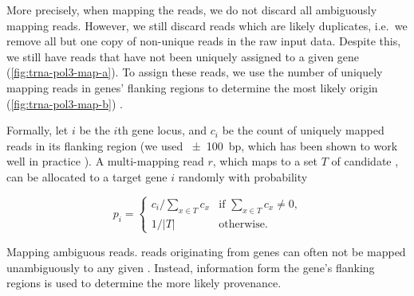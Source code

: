 More precisely, when mapping the reads, we do not discard all ambiguously
mapping reads. However, we still discard reads which are likely \pcr duplicates,
i.e.\ we remove all but one copy of non-unique reads in the raw input data.
Despite this, we still have reads that have not been uniquely assigned to a
given \trna gene (\cref{fig:trna-pol3-map-a}). To assign these reads, we use the
number of uniquely mapping reads in \trna genes’ flanking regions to determine
the most likely origin (\cref{fig:trna-pol3-map-b}) \citep{Kutter:2011}.

Formally, let \(i\) be the \(i\)th \trna gene locus, and \(c_i\) be the count of
uniquely mapped reads in its flanking region (we used \SI{\pm100}{bp}, which has
been shown to work well in practice \citep{Kutter:2011}). A multi-mapping read
\(r\), which maps to a set \(T\) of candidate \trna[s], can be allocated to a
target \trna gene \(i\) randomly with probability

\begin{equation}
    p_i = \begin{cases}
        c_i \big/ \sum_{x \in T}c_x &
            \text{if \(\sum_{x \in T}c_x \neq 0\),} \\
        1 \big/ \vert T \rvert & \text{otherwise.}
    \end{cases}
\end{equation}

    {Mapping ambiguous \chip reads.}
    {\chip reads originating from \trna genes can often not be mapped
    unambiguously to any given \trna. Instead, information form the gene’s
    flanking regions is used to determine the more likely provenance.}
